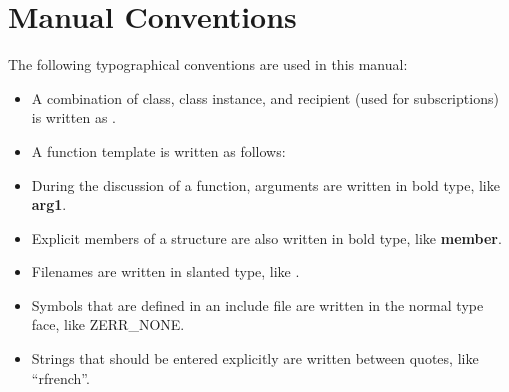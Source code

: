 %
\section{Manual Conventions}
\label{conventions}

The following typographical conventions are used in this manual:

\begin{itemize}
\item A combination of class, class instance, and recipient (used for
subscriptions) is written as .

\item A function template is written as follows:

\nwetemplate
{}

\item During the discussion of a function, arguments are written in
bold type, like {\bf arg1}.

\item Explicit members of a structure are also written in bold type,
like {\bf member}.

\item Filenames are written in slanted type, like .

\item Symbols that are defined in an include file are written in the
normal type face, like ZERR_NONE.

\item Strings that should be entered explicitly are written between
quotes, like ``rfrench''.
\end{itemize}

